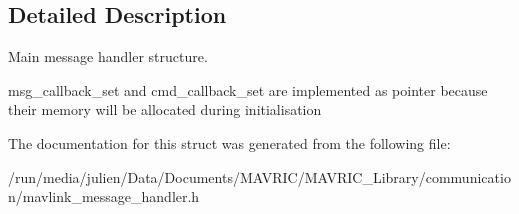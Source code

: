 \subsection{Detailed Description}
Main message handler structure. 

msg\+\_\+callback\+\_\+set and cmd\+\_\+callback\+\_\+set are implemented as pointer because their memory will be allocated during initialisation 

The documentation for this struct was generated from the following file\+:\begin{DoxyCompactItemize}
\item 
/run/media/julien/\+Data/\+Documents/\+M\+A\+V\+R\+I\+C/\+M\+A\+V\+R\+I\+C\+\_\+\+Library/communication/mavlink\+\_\+message\+\_\+handler.\+h\end{DoxyCompactItemize}
